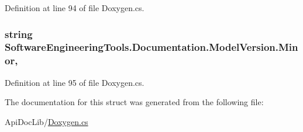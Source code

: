Definition at line 94 of file Doxygen.\+cs.

\hypertarget{struct_software_engineering_tools_1_1_documentation_1_1_model_version_a7dd1df3f1dba46b7f459e9b3fc64e65c}{
\subsubsection[{Minor}]{\setlength{\rightskip}{0pt plus 5cm}string Software\+Engineering\+Tools.\+Documentation.\+Model\+Version.\+Minor\hspace{0.3cm}{\ttfamily [get]}, {\ttfamily [set]}}}\label{struct_software_engineering_tools_1_1_documentation_1_1_model_version_a7dd1df3f1dba46b7f459e9b3fc64e65c}


Definition at line 95 of file Doxygen.\+cs.



The documentation for this struct was generated from the following file\+:\begin{DoxyCompactItemize}
\item 
Api\+Doc\+Lib/\hyperlink{_doxygen_8cs}{Doxygen.\+cs}\end{DoxyCompactItemize}
